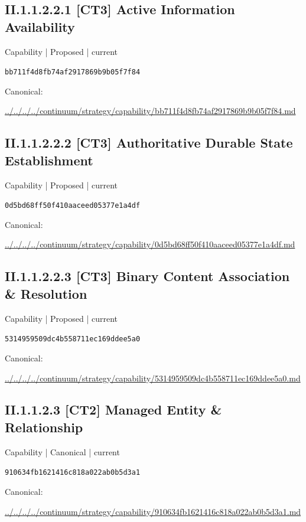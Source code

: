 \documentclass[10pt,a4paper]{article}
\begin{document}
\subsection*{II.1.1.2.2.1 [CT3] Active Information Availability}
{\small Capability | Proposed | current}\par
\texttt{bb711f4d8fb74af2917869b9b05f7f84}\par
Canonical: \par
{\footnotesize\url{../../../../continuum/strategy/capability/bb711f4d8fb74af2917869b9b05f7f84.md}}\par
\subsection*{II.1.1.2.2.2 [CT3] Authoritative Durable State Establishment}
{\small Capability | Proposed | current}\par
\texttt{0d5bd68ff50f410aaceed05377e1a4df}\par
Canonical: \par
{\footnotesize\url{../../../../continuum/strategy/capability/0d5bd68ff50f410aaceed05377e1a4df.md}}\par
\subsection*{II.1.1.2.2.3 [CT3] Binary Content Association \& Resolution}
{\small Capability | Proposed | current}\par
\texttt{5314959509dc4b558711ec169ddee5a0}\par
Canonical: \par
{\footnotesize\url{../../../../continuum/strategy/capability/5314959509dc4b558711ec169ddee5a0.md}}\par
\subsection*{II.1.1.2.3 [CT2] Managed Entity \& Relationship}
{\small Capability | Canonical | current}\par
\texttt{910634fb1621416c818a022ab0b5d3a1}\par
Canonical: \par
{\footnotesize\url{../../../../continuum/strategy/capability/910634fb1621416c818a022ab0b5d3a1.md}}\par
\end{document}
